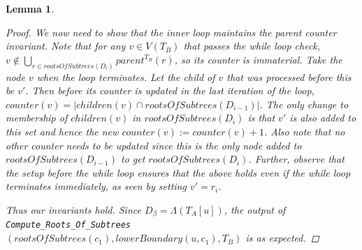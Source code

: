 \documentclass{article}
\newcommand{\leafset}{\Lambda}
\newtheorem{computerootsofsubtreescorrectness}[incompatibility]{Lemma}
\begin{document}
\begin{computerootsofsubtreescorrectness}
\begin{proof}
            We now need to show that the inner loop maintains the parent counter invariant. Note that for any $v \in V(T_B)$ that passes the while loop check, $v \not\in \bigcup_{r \in rootsOfSubtrees(D_i)} parent^{T_B}(r)$, so its counter is immaterial. Take the node $v$ when the loop terminates. Let the child of $v$ that was processed before this be $v'$. Then before its counter is updated in the last iteration of the loop, $counter(v) = |children(v) \cap rootsOfSubtrees(D_{i-1})|$. The only change to membership of $children(v)$ in $rootsOfSubtrees(D_i)$ is that $v'$ is also added to this set and hence the new $counter(v) := counter(v) + 1$. Also note that no other counter needs to be updated since this is the only node added to $rootsOfSubtrees(D_{i-1})$ to get $rootsOfSubtrees(D_i)$. Further, observe that the setup before the while loop ensures that the above holds even if the while loop terminates immediately, as seen by setting $v' = r_i$.

            Thus our invariants hold. Since $D_{\beta} = \leafset(T_A[u])$, the output of\\ %
            \texttt{Compute\_Roots\_Of\_Subtrees}$(rootsOfSubtrees(c_1), lowerBoundary(u, c_1), T_B)$ is as expected.
        \end{proof}
    \end{computerootsofsubtreescorrectness}
\end{document}
